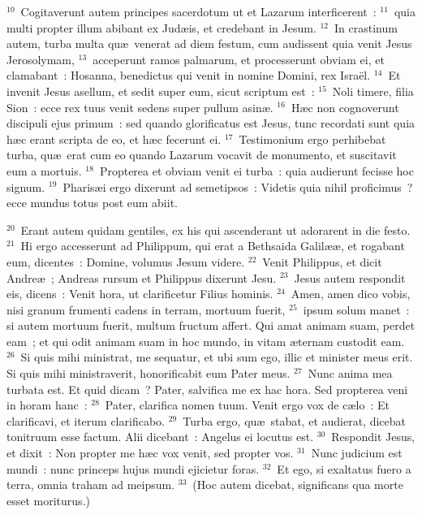 ${}^{10}$~Cogitaverunt autem principes sacerdotum ut et Lazarum interficerent~:
${}^{11}$~quia multi propter illum abibant ex Jud\ae is, et credebant in Jesum.
${}^{12}$~In crastinum autem, turba multa qu\ae\ venerat ad diem festum, cum audissent quia venit Jesus Jerosolymam,
${}^{13}$~acceperunt ramos palmarum, et processerunt obviam ei, et clamabant~: Hosanna, benedictus qui venit in nomine Domini, rex Isra\"el.
${}^{14}$~Et invenit Jesus asellum, et sedit super eum, sicut scriptum est~:
${}^{15}$~Noli timere, filia Sion~: ecce rex tuus venit sedens super pullum asin\ae .
${}^{16}$~H\ae c non cognoverunt discipuli ejus primum~: sed quando glorificatus est Jesus, tunc recordati sunt quia h\ae c erant scripta de eo, et h\ae c fecerunt ei.
${}^{17}$~Testimonium ergo perhibebat turba, qu\ae\ erat cum eo quando Lazarum vocavit de monumento, et suscitavit eum a mortuis.
${}^{18}$~Propterea et obviam venit ei turba~: quia audierunt fecisse hoc signum.
${}^{19}$~Pharis\ae i ergo dixerunt ad semetipsos~: Videtis quia nihil proficimus~? ecce mundus totus post eum abiit.


${}^{20}$~Erant autem quidam gentiles, ex his qui ascenderant ut adorarent in die festo.
${}^{21}$~Hi ergo accesserunt ad Philippum, qui erat a Bethsaida Galil\ae \ae , et rogabant eum, dicentes~: Domine, volumus Jesum videre.
${}^{22}$~Venit Philippus, et dicit Andre\ae~; Andreas rursum et Philippus dixerunt Jesu.
${}^{23}$~Jesus autem respondit eis, dicens~: Venit hora, ut clarificetur Filius hominis.
${}^{24}$~Amen, amen dico vobis, nisi granum frumenti cadens in terram, mortuum fuerit,
${}^{25}$~ipsum solum manet~: si autem mortuum fuerit, multum fructum affert. Qui amat animam suam, perdet eam~; et qui odit animam suam in hoc mundo, in vitam \ae ternam custodit eam.
${}^{26}$~Si quis mihi ministrat, me sequatur, et ubi sum ego, illic et minister meus erit. Si quis mihi ministraverit, honorificabit eum Pater meus.
${}^{27}$~Nunc anima mea turbata est. Et quid dicam~? Pater, salvifica me ex hac hora. Sed propterea veni in horam hanc~:
${}^{28}$~Pater, clarifica nomen tuum. Venit ergo vox de c\ae lo~: Et clarificavi, et iterum clarificabo.
${}^{29}$~Turba ergo, qu\ae\ stabat, et audierat, dicebat tonitruum esse factum. Alii dicebant~: Angelus ei locutus est.
${}^{30}$~Respondit Jesus, et dixit~: Non propter me h\ae c vox venit, sed propter vos.
${}^{31}$~Nunc judicium est mundi~: nunc princeps hujus mundi ejicietur foras.
${}^{32}$~Et ego, si exaltatus fuero a terra, omnia traham ad meipsum.
${}^{33}$~(Hoc autem dicebat, significans qua morte esset moriturus.)


